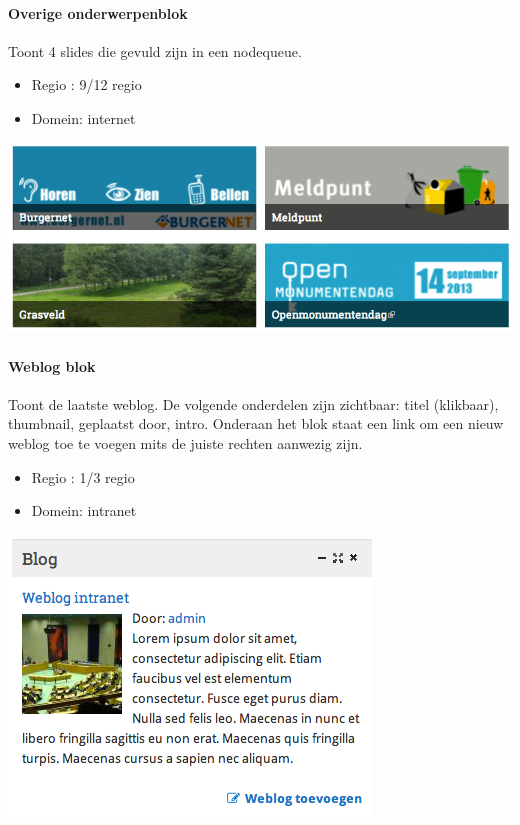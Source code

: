 \paragraph{Overige onderwerpenblok}

Toont 4 slides die gevuld zijn in een nodequeue.

\begin{itemize}
\item Regio : 9/12 regio
\item Domein: internet
\end{itemize}

\begin{center}
	\includegraphics[scale=0.5]{img/blokken/onderwerpen.png}
\end{center}

\paragraph{Weblog blok}

Toont de laatste weblog. De volgende onderdelen zijn zichtbaar: titel (klikbaar), thumbnail, geplaatst door, intro. Onderaan het blok staat een link om een nieuw weblog toe te voegen mits de juiste rechten aanwezig zijn.

\begin{itemize}
\item Regio : 1/3 regio
\item Domein: intranet
\end{itemize}

\begin{center}
	\includegraphics[scale=0.5]{img/blokken/blog.png}
\end{center}